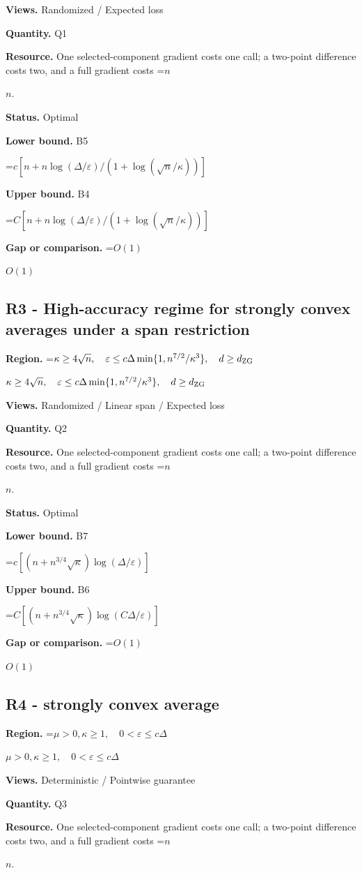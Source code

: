 \documentclass[10pt,a4paper]{article}
\newcommand{\AtlasMath}[1]{\par\begingroup\centering\setbox0=\hbox{$\displaystyle #1$}\ifdim\wd0>1.4\linewidth\typeout{ATLAS WIDE FORMULA: \the\wd0}\fi\ifdim\wd0>\linewidth\resizebox{\linewidth}{!}{\box0}\else\box0\fi\par\endgroup}
\newcommand{\AtlasInlineMath}[1]{\begingroup\setbox0=\hbox{$#1$}\ifdim\wd0>.4\linewidth\endgroup\AtlasMath{#1}\else\endgroup$#1$\fi}
\begin{document}
\textbf{Views.} Randomized / Expected loss

\textbf{Quantity.} Q1

\textbf{Resource.} One selected-component gradient costs one call; a two-point difference costs two, and a full gradient costs \AtlasInlineMath{n}.

\textbf{Status.} Optimal

\textbf{Lower bound.} B5

\AtlasMath{c[n+n\log(\Delta/\varepsilon)/(1+\log(\sqrt n/\kappa))]}
\textbf{Upper bound.} B4

\AtlasMath{C[n+n\log(\Delta/\varepsilon)/(1+\log(\sqrt n/\kappa))]}
\textbf{Gap or comparison.} \AtlasInlineMath{O(1)}

\subsection{R3 - High-accuracy regime for strongly convex averages under a span restriction}
\textbf{Region.} \AtlasInlineMath{\kappa\ge4\sqrt n,\quad\varepsilon\le c\Delta\min\{1,n^{7/2}/\kappa^3\},\quad d\ge d_{\rm ZG}}

\textbf{Views.} Randomized / Linear span / Expected loss

\textbf{Quantity.} Q2

\textbf{Resource.} One selected-component gradient costs one call; a two-point difference costs two, and a full gradient costs \AtlasInlineMath{n}.

\textbf{Status.} Optimal

\textbf{Lower bound.} B7

\AtlasMath{c[(n+n^{3/4}\sqrt\kappa)\log(\Delta/\varepsilon)]}
\textbf{Upper bound.} B6

\AtlasMath{C[(n+n^{3/4}\sqrt\kappa)\log(C\Delta/\varepsilon)]}
\textbf{Gap or comparison.} \AtlasInlineMath{O(1)}

\subsection{R4 - strongly convex average}
\textbf{Region.} \AtlasInlineMath{\mu>0,\kappa\ge1,\quad0<\varepsilon\le c\Delta}

\textbf{Views.} Deterministic / Pointwise guarantee

\textbf{Quantity.} Q3

\textbf{Resource.} One selected-component gradient costs one call; a two-point difference costs two, and a full gradient costs \AtlasInlineMath{n}.
\end{document}
